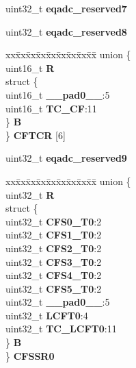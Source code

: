 \begin{DoxyCompactItemize}
\begin{tabbing}
\end{tabbing}\item 
\mbox{\label{structEQADC__tag_a6003efbffbf9248d36e1057ff1c397d5}} 
uint32\+\_\+t {\bfseries eqadc\+\_\+reserved7}
\item 
\mbox{\label{structEQADC__tag_abe3da9d7eec8b675b9f8757a3dbf4469}} 
uint32\+\_\+t {\bfseries eqadc\+\_\+reserved8}
\item 
\mbox{\label{structEQADC__tag_a1c893e74592213f72385ac5180d4bbce}} 
\begin{tabbing}
xx\=xx\=xx\=xx\=xx\=xx\=xx\=xx\=xx\=\kill
union \{\\
\>uint16\_t {\bfseries R}\\
\>struct \{\\
\>\>uint16\_t {\bfseries \_\_pad0\_\_}:5\\
\>\>uint16\_t {\bfseries TC\_CF}:11\\
\>\} {\bfseries B}\\
\} {\bfseries CFTCR} \mbox{[}6\mbox{]}\\

\end{tabbing}\item 
\mbox{\label{structEQADC__tag_aeaf76288087af5ba9f36ce3bb24cd283}} 
uint32\+\_\+t {\bfseries eqadc\+\_\+reserved9}
\item 
\mbox{\label{structEQADC__tag_a2104950b083b16ddfe4bbe52282fcb3b}} 
\begin{tabbing}
xx\=xx\=xx\=xx\=xx\=xx\=xx\=xx\=xx\=\kill
union \{\\
\>uint32\_t {\bfseries R}\\
\>struct \{\\
\>\>uint32\_t {\bfseries CFS0\_T0}:2\\
\>\>uint32\_t {\bfseries CFS1\_T0}:2\\
\>\>uint32\_t {\bfseries CFS2\_T0}:2\\
\>\>uint32\_t {\bfseries CFS3\_T0}:2\\
\>\>uint32\_t {\bfseries CFS4\_T0}:2\\
\>\>uint32\_t {\bfseries CFS5\_T0}:2\\
\>\>uint32\_t {\bfseries \_\_pad0\_\_}:5\\
\>\>uint32\_t {\bfseries LCFT0}:4\\
\>\>uint32\_t {\bfseries TC\_LCFT0}:11\\
\>\} {\bfseries B}\\
\} {\bfseries CFSSR0}\\


\end{tabbing}
\end{DoxyCompactItemize}
